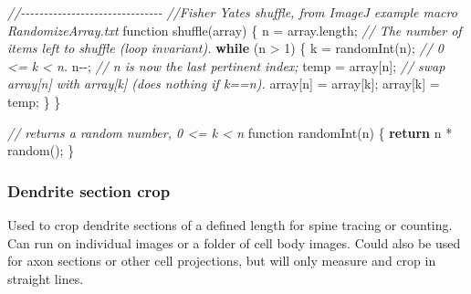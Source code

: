 \documentclass[
  12pt,
  a4paper,
]{book}
\newenvironment{Shaded}{}{}
\newcommand{\CommentTok}[1]{\textcolor[rgb]{0.38,0.63,0.69}{\textit{#1}}}
\newcommand{\ControlFlowTok}[1]{\textcolor[rgb]{0.00,0.44,0.13}{\textbf{#1}}}
\newcommand{\DecValTok}[1]{\textcolor[rgb]{0.25,0.63,0.44}{#1}}
\newcommand{\NormalTok}[1]{#1}
\newcommand{\OperatorTok}[1]{\textcolor[rgb]{0.40,0.40,0.40}{#1}}
\begin{document}
\begin{Shaded}
\begin{Highlighting}[]
\CommentTok{//{-}{-}{-}{-}{-}{-}{-}{-}{-}{-}{-}{-}{-}{-}{-}{-}{-}{-}{-}{-}{-}{-}{-}{-}{-}{-}{-}{-}{-}{-}{-}}
\CommentTok{//Fisher Yates shuffle, from ImageJ example macro RandomizeArray.txt}
\NormalTok{function shuffle}\OperatorTok{(}\NormalTok{array}\OperatorTok{)} \OperatorTok{\{}
\NormalTok{   n }\OperatorTok{=}\NormalTok{ array}\OperatorTok{.}\NormalTok{length}\OperatorTok{;}  \CommentTok{// The number of items left to shuffle (loop invariant).}
   \ControlFlowTok{while} \OperatorTok{(}\NormalTok{n }\OperatorTok{\textgreater{}} \DecValTok{1}\OperatorTok{)} \OperatorTok{\{}
\NormalTok{      k }\OperatorTok{=}\NormalTok{ randomInt}\OperatorTok{(}\NormalTok{n}\OperatorTok{);}     \CommentTok{// 0 \textless{}= k \textless{} n.}
\NormalTok{      n}\OperatorTok{{-}{-};}                  \CommentTok{// n is now the last pertinent index;}
\NormalTok{      temp }\OperatorTok{=}\NormalTok{ array}\OperatorTok{[}\NormalTok{n}\OperatorTok{];}  \CommentTok{// swap array[n] with array[k] (does nothing if k==n).}
\NormalTok{      array}\OperatorTok{[}\NormalTok{n}\OperatorTok{]} \OperatorTok{=}\NormalTok{ array}\OperatorTok{[}\NormalTok{k}\OperatorTok{];}
\NormalTok{      array}\OperatorTok{[}\NormalTok{k}\OperatorTok{]} \OperatorTok{=}\NormalTok{ temp}\OperatorTok{;}
   \OperatorTok{\}}
\OperatorTok{\}}

\CommentTok{// returns a random number, 0 \textless{}= k \textless{} n}
\NormalTok{function randomInt}\OperatorTok{(}\NormalTok{n}\OperatorTok{)} \OperatorTok{\{}
   \ControlFlowTok{return}\NormalTok{ n }\OperatorTok{*}\NormalTok{ random}\OperatorTok{();}
\OperatorTok{\}}
\end{Highlighting}
\end{Shaded}

\subsubsection{Dendrite section crop}\label{dend-crop}

Used to crop dendrite sections of a defined length for spine tracing or counting. Can run on individual images or a folder of cell body images. Could also be used for axon sections or other cell projections, but will only measure and crop in straight lines.
\end{document}

